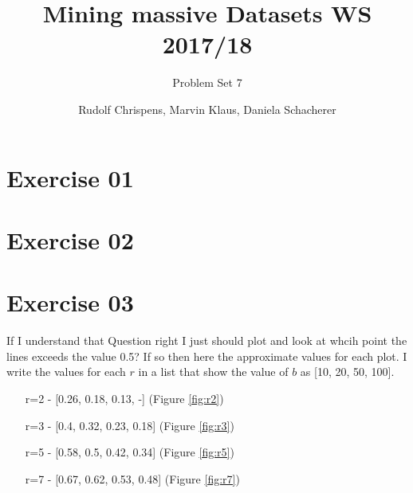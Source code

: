 \documentclass[11pt,a4paper]{scrartcl}
\title{Mining massive Datasets WS 2017/18}
\subtitle{Problem Set 7}
\author{Rudolf Chrispens, Marvin Klaus, Daniela Schacherer}
\begin{document}
\maketitle

\section*{Exercise 01}

\section*{Exercise 02}

\section*{Exercise 03}

If I understand that Question right I just should plot and look at whcih point the lines exceeds the value 0.5? If so then here the approximate values for each plot. I write the values for each $r$ in a list that show the value of $b$ as [10, 20, 50, 100].

\begin{itemize}
    \item [r=2] - [0.26, 0.18, 0.13, -] (Figure \ref{fig:r2})
    \item [r=3] - [0.4, 0.32, 0.23, 0.18] (Figure \ref{fig:r3})
    \item [r=5] - [0.58, 0.5, 0.42, 0.34] (Figure \ref{fig:r5})
    \item [r=7] - [0.67, 0.62, 0.53, 0.48] (Figure \ref{fig:r7})
\end{itemize}
\end{document}
